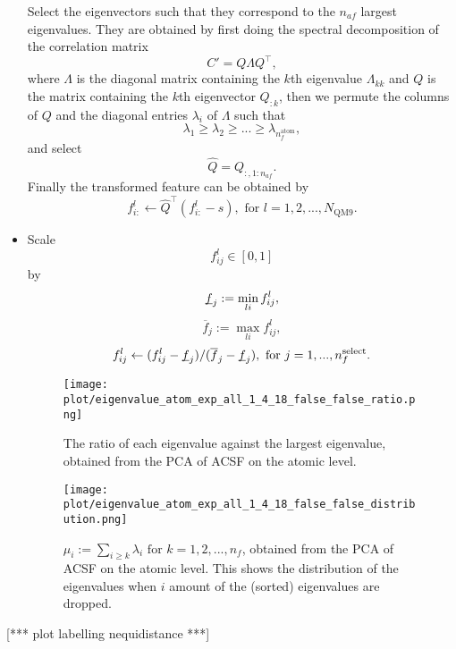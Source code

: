 \documentclass[12pt]{article}
\def\att{                    %
        \marginpar[ \hspace*{\fill} \raisebox{-0.2em}{\rule{2mm}{1.2em}} ]
        {\raisebox{-0.2em}{\rule{2mm}{1.2em}} }
        }
\def\at#1{[*** \att #1 ***]}  %
\begin{document}
\begin{itemize}
	Select the eigenvectors such that they correspond to the $n_{af}$ largest eigenvalues. They are obtained by first doing the spectral decomposition of the correlation matrix
	\begin{equation}
		C' = Q\Lambda Q^\top,
	\end{equation}
	where $\Lambda$ is the diagonal matrix containing the $k$th eigenvalue $\Lambda_{kk}$ and $Q$ is the matrix containing the $k$th eigenvector $Q_{:k}$, then we permute the columns of $Q$ and the diagonal entries $\lambda_i$ of $\Lambda$ such that
	\begin{equation}
		\lambda_{1} \geq \lambda_{2} \geq  ... \geq \lambda_{n^\text{atom}_f},
	\end{equation}
	and select
	\begin{equation}
		\hat{Q} = Q_{:, 1:n_{af}}.
	\end{equation}
	Finally the transformed feature can be obtained by
	\begin{equation}
		\label{eq:pca_atom_end}
		f^l_{i:} \leftarrow \hat{Q}^\top(f^l_{i:} - s), \text{ for }l = 1,2,...,N_\text{QM9}.
	\end{equation}
	\item Scale
	\begin{equation}
		\label{eq:scale_1}
		f^l_{ij} \in [0, 1]
	\end{equation}
	by
	\begin{equation}
		\underbar{$f$}_j := \min_{li} f^l_{ij},
	\end{equation}
	\begin{equation}
		\overline{f}_j := \max_{li} f^l_{ij},
	\end{equation}
	\begin{equation}
		f^l_{ij} \leftarrow (f^l_{ij} - \underbar{$f$}_j)/ (\overline{f}_j - \underbar{$f$}_j), \text{ for } j = 1,..., n_f^\text{select}.
	\end{equation}
	\begin{figure}[H]
		\label{fig:PCA_atom_rat}
		\centering
		\texttt{[image: plot/eigenvalue\_atom\_exp\_all\_1\_4\_18\_false\_false\_ratio.png]}
		\caption{The ratio of each eigenvalue against the largest eigenvalue, obtained from the PCA of ACSF on the atomic level.}
	\end{figure}
	\begin{figure}[H]
		\label{fig:PCA_atom_dist}
		\centering
		\texttt{[image: plot/eigenvalue\_atom\_exp\_all\_1\_4\_18\_false\_false\_distribution.png]}
		\caption{$\mu_i := \sum_{i\geq k} \lambda_i \text{ for } k = 1,2,...,n_f$, obtained from the PCA of ACSF on the atomic level. This shows the distribution of the eigenvalues when $i$ amount of the (sorted) eigenvalues are dropped.}
	\end{figure}
\end{itemize}
\at{plot labelling nequidistance}
\end{document}
